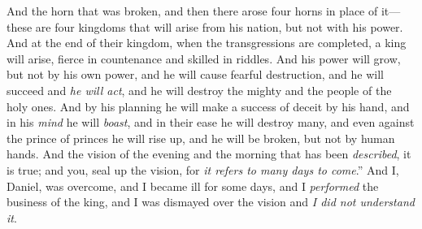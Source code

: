 \begin{biblechapter}
\verse And the horn that was broken, and then there arose four horns in place of it—these are four kingdoms that will arise from his nation, but not with his power.
\verse And at the end of their kingdom, when the transgressions are completed, a king will arise, fierce in countenance and skilled in riddles.
\verse And his power will grow, but not by his own power, and he will cause fearful destruction, and he will succeed and \textit{he will act}, and he will destroy the mighty and the people of the holy ones.
\verse And by his planning he will make a success of deceit by his hand, and in his \textit{mind} he will \textit{boast}, and in their ease he will destroy many, and even against the prince of princes he will rise up, and he will be broken, but not by human hands.
\verse And the vision of the evening and the morning that has been \textit{described}, it is true; and you, seal up the vision, for \textit{it refers to many days to come}.”
\verse And I, Daniel, was overcome, and I became ill for some days, and I \textit{performed} the business of the king, and I was dismayed over the vision and \textit{I did not understand it}.
\end{biblechapter}

